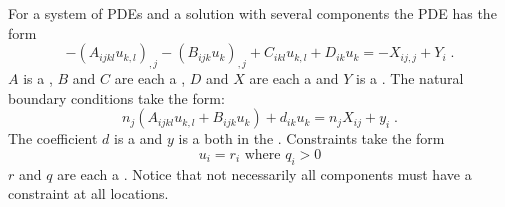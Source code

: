 For a system of PDEs and a solution with several components the PDE has the form
\begin{equation}\label{LINEARPDE.SYSTEM.1}
-(A_{ijkl} u_{k,l})_{,j}-(B_{ijk} u_{k})_{,j}+C_{ikl} u_{k,l}+D_{ik} u_{k} =-X_{ij,j}+Y_{i} \; .
\end{equation}
$A$ is a \RankFour, $B$ and $C$ are each a \RankThree, $D$ and $X$ are each a \RankTwo and $Y$ is a \RankOne.
The natural boundary conditions take the form:
\begin{equation}\label{LINEARPDE.SYSTEM.2}
n_{j}(A_{ijkl} u_{k,l}+B_{ijk} u_{k})+d_{ik} u_{k}=n_{j}X_{ij}+y_{i}  \;.
\end{equation}
The coefficient $d$ is a \RankTwo and $y$ is a \RankOne both in the
\FunctionOnBoundary. Constraints take the form
\begin{equation}\label{LINEARPDE.SYSTEM.3}
u_{i}=r_{i} \mbox{ where } q_{i}>0
\end{equation}
$r$ and $q$ are each a \RankOne. Notice that not necessarily all components
must have a constraint at all locations.

